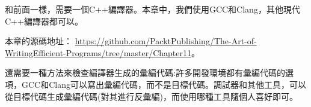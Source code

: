 和前面一樣，需要一個C++編譯器。本章中，我們使用GCC和Clang，其他現代C++編譯器都可以。 

本章的源碼地址： \url{https://github.com/PacktPublishing/The-Art-of-WritingEfficient-Programs/tree/master/Chapter11}。

還需要一種方法來檢查編譯器生成的彙編代碼:許多開發環境都有彙編代碼的選項，GCC和Clang可以寫出彙編代碼，而不是目標代碼。調試器和其他工具，可以從目標代碼生成彙編代碼(對其進行反彙編)，而使用哪種工具隨個人喜好即可。